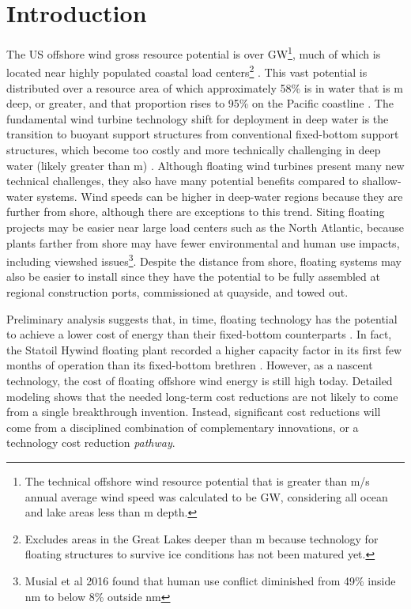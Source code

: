\chapter{Introduction}
\label{sec:intro}

The US offshore wind gross resource potential is over
\unit[2000]{GW}\footnote{The technical offshore wind resource potential
  that is greater than \unit[7]{m/s} annual average wind speed was
  calculated to be \unit[2058]{GW}, considering all ocean and lake areas
  less than \unit[1000]{m} depth.}, much of which is located near highly
populated coastal load centers\footnote{Excludes areas in the Great
  Lakes deeper than \unit[60]{m} because technology for floating
  structures to survive ice conditions has not been matured yet.}
\citep{resource}.  This vast potential is distributed over a resource
area of which approximately 58\% is in water that is \unit[60]{m} deep,
or greater, and that proportion rises to 95\% on the Pacific coastline
\citep{musial-ca}. The fundamental wind turbine technology shift for
deployment in deep water is the transition to buoyant support structures
from conventional fixed-bottom support structures, which become too
costly and more technically challenging in deep water (likely greater
than \unit[50]{m}) \citep{obos}. Although floating wind turbines present
many new technical challenges, they also have many potential benefits
compared to shallow-water systems.  Wind speeds can be higher in
deep-water regions because they are further from shore, although there
are exceptions to this trend.  Siting floating projects may be easier
near large load centers such as the North Atlantic, because plants
farther from shore may have fewer environmental and human use impacts,
including viewshed issues\footnote{Musial et al 2016 found that human
  use conflict diminished from 49\% inside \unit[3]{nm} to below 8\%
  outside \unit[50]{nm}}.  Despite the distance from shore, floating
systems may also be easier to install since they have the potential to
be fully assembled at regional construction ports, commissioned at
quayside, and towed out.

Preliminary analysis suggests that, in time, floating technology has the
potential to achieve a lower cost of energy than their fixed-bottom
counterparts \citep{spatial}.  In fact, the Statoil Hywind floating plant
recorded a higher capacity factor in its first few months of operation
than its fixed-bottom brethren \citep{statoil-hywind}.  However, as a
nascent technology, the cost of floating offshore wind energy is still
high today.  Detailed modeling shows that the needed long-term cost
reductions are not likely to come from a single breakthrough
invention.  Instead, significant cost reductions will come from a
disciplined combination of complementary innovations, or a technology
cost reduction \textit{pathway}.

